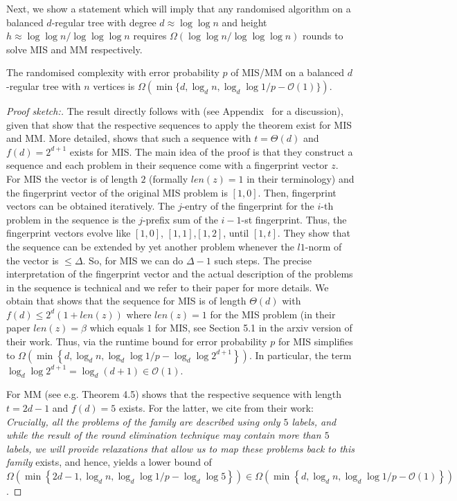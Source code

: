 \documentclass[letterpaper,11pt]{article}
\newcommand{\1}{\mathbb I}
\newcommand{\bigO}{\mathcal{O}}
\begin{document}
%
Next, we show a statement which will imply that any randomised algorithm on a balanced $d$-regular tree with degree $d \approx \log\log n$ and height $h \approx \log\log n / \log\log\log n$ requires $\Omega(\log\log n / \log\log\log n)$ rounds to solve MIS and MM respectively.
%
\begin{lemma}
\label{lem:treeMISMMLowerbound}
The randomised complexity with error probability $p$ of MIS/MM on a balanced $d$-regular tree with $n$ vertices is $\Omega(\min\{d, \log_d n, \log_d \log {1/p}-\bigO(1)\})$.
\end{lemma}
\begin{proof}[Proof sketch:]
The result directly follows with  (see Appendix~ for a discussion), given that \cite{BBKO22} show that the respective sequences to apply the theorem exist for MIS and MM. More detailed,  \cite{BBKO22} shows that such a sequence with  $t=\Theta(d)$ and $f(d)=2^{d+1}$ exists for MIS. The main idea of the proof is that they construct a sequence and each problem in their sequence come with a fingerprint vector $z$. For MIS the vector is of length $2$ (formally $len(z)=1$ in their terminology) and the fingerprint vector of the original MIS problem is $[1,0]$. Then, fingerprint vectors can be obtained iteratively. The $j$-entry of the fingerprint for the $i$-th problem in the sequence is the $j$-prefix sum of the $i-1$-st fingerprint. Thus, the fingerprint vectors evolve like $[1,0]$, $[1,1]$,$[1,2]$, until $[1,t]$. They show that the sequence can be extended by yet another problem whenever the $l1$-norm of the vector is $\leq \Delta$. So, for MIS we can do $\Delta-1$ such steps. The precise interpretation of the fingerprint vector and the actual description of the problems in the sequence is technical and we refer to their paper for more details. We obtain that \cite[Lemma 6.1]{BBKO22} shows that the sequence for MIS is of length $\Theta(d)$ with $f(d)\leq 2^d(1+len(z))$ where $len(z)=1$ for the MIS problem (in their paper $len(z)=\beta$ which equals $1$ for MIS, see Section 5.1 in the arxiv version of their work.  
Thus, via  the runtime bound for error probability $p$ for MIS simplifies to $\Omega\left(\min\left\{d,\log_{d}n, \log_{d}\log 1/p-\log_{d}\log 2^{d+1}\right\}\right)$. In particular, the term $\log_{d}\log 2^{d+1} = \log_{d}({d+1}) \in \bigO(1)$.

For MM \cite{BO20} (see e.g. Theorem 4.5) shows that the respective sequence with length $t=2d-1$ and $f(d)=5$ exists. For the latter, we cite from their work: \emph{Crucially, all the problems of the family are described using only $5$ labels, and while the result of the round elimination technique may contain more than $5$ labels, we will provide relaxations that allow us to map these problems back to this family} exists, and hence,  yields a lower bound of  $\Omega\left(\min\left\{2d-1,\log_{d}n, \log_{d}\log 1/p-\log_{d}\log 5\right\}\right) \in \Omega\left(\min\left\{d,\log_{d}n, \log_{d}\log 1/p-\bigO(1)\right\}\right)$.
\end{proof}
\end{document}
